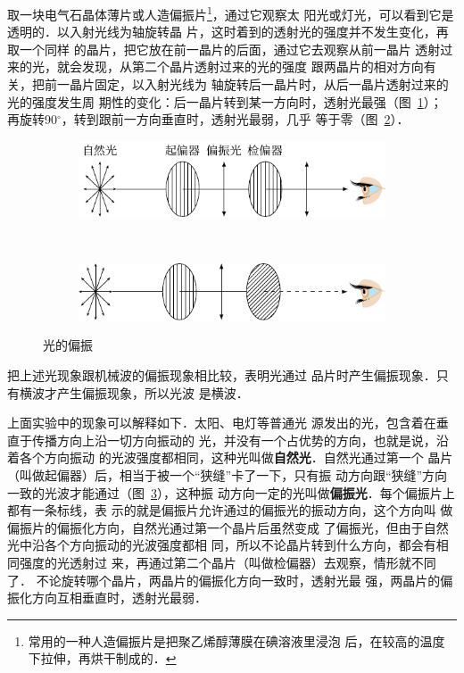 取一块电气石晶体薄片或人造偏振片\footnote{常用的一种人造偏振片是把聚乙烯醇薄膜在碘溶液里浸泡
后，在较高的温度下拉伸，再烘干制成的．}，通过它观察太
阳光或灯光，可以看到它是透明的．以入射光线为轴旋转晶
片，这时着到的透射光的强度并不发生变化，再取一个同样
的晶片，把它放在前一晶片的后面，通过它去观察从前一晶片
透射过来的光，就会发现，从第二个晶片透射过来的光的强度
跟两晶片的相对方向有关，把前一晶片固定，以入射光线为
轴旋转后一晶片时，从后一晶片透射过来的光的强度发生周
期性的变化：后一晶片转到某一方向时，透射光最强（图~\ref{fig_C_6-13a}）；
再旋转90$^\circ$，转到跟前一方向垂直时，透射光最弱，几乎
等于零（图~\ref{fig_C_6-13b}）．
\begin{figure}[htbp]
    \centering
    \begin{subfigure}{0.8\linewidth}
        \centering
        \includegraphics{fig/C/6-13a.pdf}
        \caption{}\label{fig_C_6-13a}
    \end{subfigure}
    \\
    \begin{subfigure}{0.8\linewidth}
        \centering
        \includegraphics{fig/C/6-13b.pdf}
        \caption{}\label{fig_C_6-13b}
    \end{subfigure}
    \caption{光的偏振}\label{fig_C_6-13}
\end{figure}

把上述光现象跟机械波的偏振现象相比较，表明光通过
品片时产生偏振现象．只有横波才产生偏振现象，所以光波
是横波．

上面实验中的现象可以解释如下．太阳、电灯等普通光
源发出的光，包含着在垂直于传播方向上沿一切方向振动的
光，并没有一个占优势的方向，也就是说，沿着各个方向振动
的光波强度都相同，这种光叫做\textbf{自然光}．自然光通过第一个
晶片（叫做起偏器）后，相当于被一个“狭缝”卡了一下，只有振
动方向跟“狭缝”方向一致的光波才能通过（图~\ref{fig_C_6-13}），这种振
动方向一定的光叫做\textbf{偏振光}．每个偏振片上都有一条标线，表
示的就是偏振片允许通过的偏振光的振动方向，这个方向叫
做偏振片的偏振化方向，自然光通过第一个晶片后虽然变成
了偏振光，但由于自然光中沿各个方向振动的光波强度都相
同，所以不论晶片转到什么方向，都会有相同强度的光透射过
来，再通过第二个晶片（叫做检偏器）去观察，情形就不同了．
不论旋转哪个晶片，两晶片的偏振化方向一致时，透射光最
强，两晶片的偏振化方向互相垂直时，透射光最弱．


